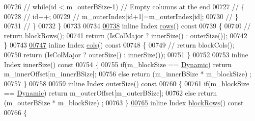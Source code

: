 \begin{DoxyCode}
00726 \textcolor{comment}{//      while(id < m\_outerBSize-1) // Empty columns at the end}
00727 \textcolor{comment}{//      \{}
00728 \textcolor{comment}{//        id++;}
00729 \textcolor{comment}{//        m\_outerIndex[id+1]=m\_outerIndex[id];}
00730 \textcolor{comment}{//      \}}
00731 \textcolor{comment}{//      \}}
00732     \}
00733 
00734 
\hyperlink{group___sparse_core___module_a89c2e0b48b6425c4828a794f4c654796}{00738}     \textcolor{keyword}{inline} Index \hyperlink{group___sparse_core___module_a89c2e0b48b6425c4828a794f4c654796}{rows}()\textcolor{keyword}{ const}
00739 \textcolor{keyword}{    }\{
00740 \textcolor{comment}{//      return blockRows();}
00741       \textcolor{keywordflow}{return} (IsColMajor ? innerSize() : outerSize());
00742     \}
00743 
\hyperlink{group___sparse_core___module_aa689bd28af9a8176d1c793c075aa0a42}{00747}     \textcolor{keyword}{inline} Index \hyperlink{group___sparse_core___module_aa689bd28af9a8176d1c793c075aa0a42}{cols}()\textcolor{keyword}{ const}
00748 \textcolor{keyword}{    }\{
00749 \textcolor{comment}{//      return blockCols();}
00750       \textcolor{keywordflow}{return} (IsColMajor ? outerSize() : innerSize());
00751     \}
00752 
00753     \textcolor{keyword}{inline} Index innerSize()\textcolor{keyword}{ const}
00754 \textcolor{keyword}{    }\{
00755       \textcolor{keywordflow}{if}(m\_blockSize == \hyperlink{namespace_eigen_ad81fa7195215a0ce30017dfac309f0b2}{Dynamic}) \textcolor{keywordflow}{return} m\_innerOffset[m\_innerBSize];
00756       \textcolor{keywordflow}{else} \textcolor{keywordflow}{return}  (m\_innerBSize * m\_blockSize) ;
00757     \}
00758 
00759     \textcolor{keyword}{inline} Index outerSize()\textcolor{keyword}{ const}
00760 \textcolor{keyword}{    }\{
00761       \textcolor{keywordflow}{if}(m\_blockSize == \hyperlink{namespace_eigen_ad81fa7195215a0ce30017dfac309f0b2}{Dynamic}) \textcolor{keywordflow}{return} m\_outerOffset[m\_outerBSize];
00762       \textcolor{keywordflow}{else} \textcolor{keywordflow}{return}  (m\_outerBSize * m\_blockSize) ;
00763     \}
\hyperlink{group___sparse_core___module_a5f4768ab4e48f7f81cd8a3697d3016e8}{00765}     \textcolor{keyword}{inline} Index \hyperlink{group___sparse_core___module_a5f4768ab4e48f7f81cd8a3697d3016e8}{blockRows}()\textcolor{keyword}{ const}
00766 \textcolor{keyword}{    }\{

\end{DoxyCode}
